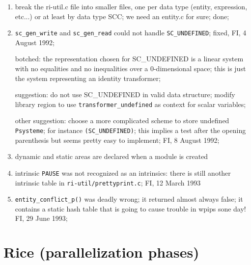 \begin{enumerate}

  \item break the ri-util.c file into smaller files, one per data type
	(entity, expression, etc...) or at least by data type SCC; we
	need an entity.c for sure; done;

  \item \verb+sc_gen_write+ and \verb+sc_gen_read+ could not handle
	\verb+SC_UNDEFINED+; fixed, FI, 4 August 1992;

	botched: the representation chosen for SC_UNDEFINED is a linear system
	with no equalities and no inequalities over a 0-dimensional space;
	this is just the system representing an identity transformer;

	suggestion: do not use SC_UNDEFINED in valid data structure;
	modify library region to use \verb+transformer_undefined+ as
	context for scalar variables;

	other suggestion: choose a more complicated scheme to store
	undefined \verb+Psysteme+; for instance \verb+(SC_UNDEFINED)+;
	this implies a test after the opening parenthesis but seems
	pretty easy to implement; FI, 8 August 1992;

  \item dynamic and static areas are declared when a module is created

  \item intrinsic \verb+PAUSE+ was not recognized as an intrinsics:
	there is still another intrinsic table in
	\verb+ri-util/prettyprint.c+;
	FI, 12 March 1993

  \item \verb+entity_conflict_p()+ was deadly wrong; it returned almost
	always false; it contains a static hash table that is going to
	cause trouble in wpips sone day! FI, 29 June 1993;

\end{enumerate}

\section{Rice (parallelization phases)}

